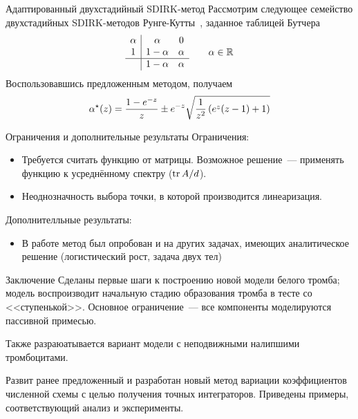 \documentclass[
    14pt,
    xcolor=dvipsnames,
    aspectratio=169
]{beamer}
\begin{document}
\begin{frame}{Адаптированный двухстадийный SDIRK-метод}
    Рассмотрим следующее семейство двухстадийных SDIRK-методов Рунге-Кутты~\cite{franko1997SDIRK},
    заданное таблицей Бутчера
    \[
        \begin{array}{c|cc}
            \alpha & \alpha & 0 \\
            1      & 1 - \alpha & \alpha \\
            \hline
            & 1 - \alpha & \alpha
        \end{array}
        \qquad
        \alpha \in \mathbb{R}
    \]
    Воспользовавшись предложенным методом, получаем
    \[
        \alpha^\star(z) = \frac{1 - e^{-z}}{z} \pm e^{-z} \sqrt{\frac{1}{z^2} \left( e^z (z - 1) + 1 \right)}
    \]
\end{frame}

\begin{frame}{Ограничения и дополнительные результаты}
    Ограничения:
    \begin{itemize}
        \item
            Требуется считать функцию от матрицы.
            Возможное решение~--- применять функцию к усреднённому спектру ($ \operatorname*{\mathrm{tr}} A / d $).
        \item
            Неоднозначность выбора точки, в которой производится линеаризация.
    \end{itemize}

    Дополнителльные результаты:
    \begin{itemize}
        \item
            В работе метод был опробован и на других задачах,
            имеющих аналитическое решение (логистический рост, задача двух тел)
    \end{itemize}
\end{frame}

\begin{frame}{Заключение}
    Сделаны первые шаги к построению новой модели белого тромба;
    модель воспроизводит начальную стадию образования тромба в тесте со <<ступенькой>>.
    Основное ограничение~--- все компоненты моделируются пассивной примесью.

    Также разраюатывается вариант модели с неподвижными налипшими тромбоцитами.

    Развит ранее предложенный и разработан новый метод вариации коэффициентов численной схемы
    с целью получения точных интеграторов.
    Приведены примеры, соответствующий анализ и эксперименты.
\end{frame}

\begin{frame}[allowframebreaks]
    \printbibliography
\end{frame}
\end{document}

